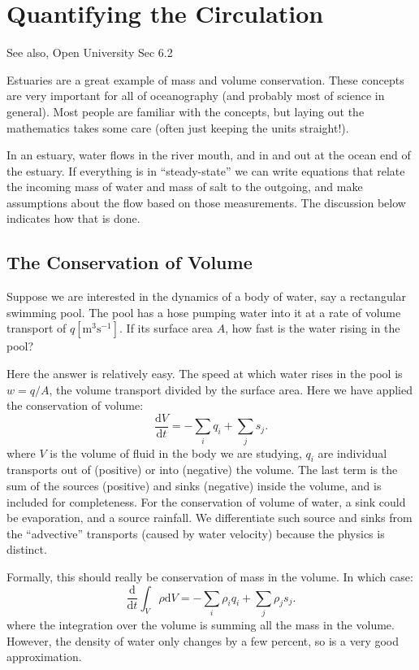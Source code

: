 \section{Quantifying the Circulation}

See also, Open University Sec 6.2

Estuaries are a great example of mass and volume conservation. These concepts are very important for all of oceanography (and probably most of science in general).  Most people are familiar with the concepts, but laying out the mathematics takes some care (often just keeping the units straight!).

In an estuary, water flows in the river mouth, and in and out at the ocean end of the estuary.  If everything is in ``steady-state'' we can write equations that relate the incoming mass of water and mass of salt to the outgoing, and make assumptions about the flow based on those measurements.  The discussion below indicates how that is done.

\subsection{The Conservation of Volume}

Suppose we are interested in the dynamics of a body of water, say a rectangular swimming pool.  The pool has a hose pumping water into it at a rate of volume transport of $q \mathrm{[m^3s^{-1}]}$.  If its surface area  $A$, how fast is the water rising in the pool?

Here the answer is relatively easy.  The speed at which water rises in the pool is $w=q/A$, the volume transport divided by the surface area.  Here we have applied the conservation of volume:
\begin{equation}
  \label{eq:VolCons}
  \frac{\mathrm{d}V}{\mathrm{d} t} = -\sum_i q_i + \sum_j s_j.
\end{equation}
where $V$ is the volume of fluid in the body we are studying, $q_i$ are individual transports out of (positive) or into (negative) the volume.  The last term is the sum of the sources (positive) and sinks (negative) inside the volume, and is included for completeness.  For the conservation of volume of water, a sink could be evaporation, and a source rainfall.  We differentiate such source and sinks from the ``advective'' transports (caused by water velocity) because the physics is distinct.

Formally, this should really be conservation of mass in the volume. In which case:
\begin{equation}
  \frac{\mathrm{d}}{\mathrm{d} t}\int_V \rho \mathrm{d}V  = -\sum_i \rho_i q_i +
  \sum_j \rho_j s_j.
\end{equation}
where the integration over the volume is summing all the mass in the volume.  However, the density of water only changes by a few percent, so  is a very good approximation.

